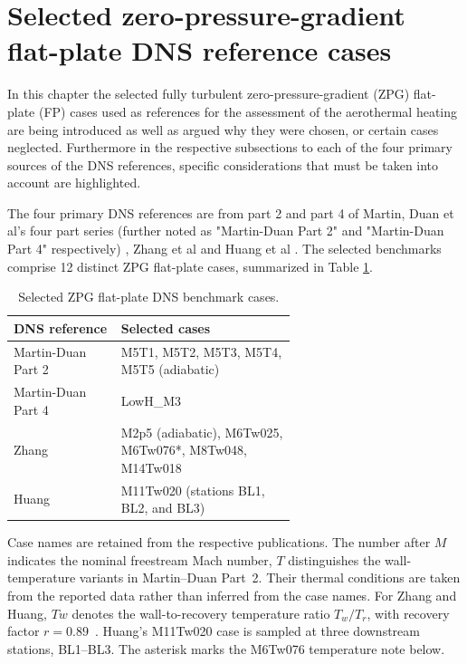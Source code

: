 \section{Selected zero-pressure-gradient flat-plate DNS reference cases}
\label{sec:evaluation:benchmark-cases}

In this chapter the selected fully turbulent zero-pressure-gradient (ZPG) flat-plate (FP) cases used as references for the assessment of the aerothermal heating are being introduced as well as argued why they were chosen, or certain cases neglected. Furthermore in the respective subsections to each of the four primary sources of the DNS references, specific considerations that must be taken into account are highlighted.
\par\medskip

The four primary DNS references are from part 2 \cite{duan2010direct_part2} and part 4 \cite{duan2011direct_Part4} of Martin, Duan et al's four part series (further noted as "Martin-Duan Part 2" and "Martin-Duan Part 4" respectively) , Zhang et al \cite{zhang2018direct} and Huang et al \cite{huang2020simulation}. The selected benchmarks comprise 12 distinct ZPG flat-plate cases, summarized in Table \ref{tab:evaluation:selected-cases}.
\begin{table}[H]
    \centering
    \caption{Selected ZPG flat-plate DNS benchmark cases.}
    \label{tab:evaluation:selected-cases}
    \begin{tabular}{@{}lp{0.62\linewidth}@{}}
        \toprule
        DNS reference & Selected cases \\
        \midrule
        Martin-Duan Part 2 &
        M5T1, M5T2, M5T3, M5T4, M5T5 (adiabatic) \\
        \addlinespace
        Martin-Duan Part 4 &
        LowH\_M3 \\
        \addlinespace
        Zhang &
        M2p5 (adiabatic), M6Tw025, M6Tw076*,
        M8Tw048, M14Tw018 \\
        \addlinespace
        Huang &
        M11Tw020 (stations BL1, BL2, and BL3) \\
        \bottomrule
    \end{tabular}
\end{table}

Case names are retained from the respective publications. The number after \(M\) indicates the nominal freestream Mach number, \(T\) distinguishes the wall-temperature variants in Martin--Duan Part~2. Their thermal conditions are taken from the reported data rather than inferred from the case names. For Zhang and Huang, \(Tw\) denotes the wall-to-recovery temperature ratio \(T_w/T_r\), with recovery factor \(r=0.89\)~\cite[Nomenclature]{zhang2018direct}. Huang's M11Tw020 case is sampled at three downstream stations, BL1--BL3. The asterisk marks the M6Tw076 temperature note below.
\par\medskip

